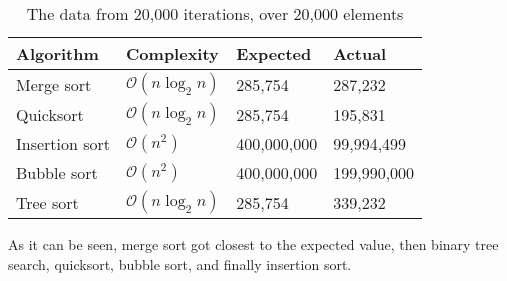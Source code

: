 \documentclass[12pt, a4paper]{article}
\begin{document}
\begin{table}[ht!]
\begin{tabular}{|p{3cm}|p{3cm}|p{3cm}|p{3cm}|}
\hline 
Algorithm & Complexity & Expected & Actual \\ 
\hline 
Merge sort & $\mathcal{O}(n \log_2 n)$ & 285,754 & 287,232 \\ 
\hline 
Quicksort & $\mathcal{O}(n \log_2 n)$ & 285,754 & 195,831 \\ 
\hline 
Insertion sort & $\mathcal{O}(n^2)$ & 400,000,000 & 99,994,499 \\ 
\hline 
Bubble sort & $\mathcal{O}(n^2)$ & 400,000,000 & 199,990,000 \\ 
\hline 
Tree sort & $\mathcal{O}(n \log_2 n)$ & 285,754 & 339,232 \\ 
\hline 
\end{tabular} 
\caption{The data from 20,000 iterations, over 20,000 elements}
\label{table:experimentalData2}
\end{table}

As it can be seen, merge sort got closest to the expected value, then binary tree search, quicksort, bubble sort, and finally insertion sort.
\end{document}
